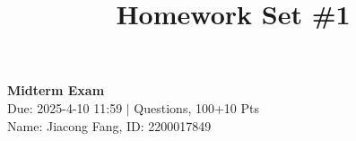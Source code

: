 \documentclass[11pt]{article}
\title{Homework Set \#1}
\begin{document}
    \pagestyle{fancy}
    \chead{}
    \fancyfoot[R]{} 
    \fancyfoot[C]{\thepage\ /\ \pageref{LastPage} \\ \textcolor{lightgray}{Last Compile: \today}}


    \begin{center}
        {\LARGE \bf Midterm Exam}\\
        {Due: 2025-4-10 11:59 \quad$|$ Questions, 100+10 Pts}\\
        {Name: Jiacong Fang, ID: 2200017849}
    \end{center}


    
    \clearpage
    
    \clearpage
    
    \clearpage
    
    \clearpage 
    
\end{document}
